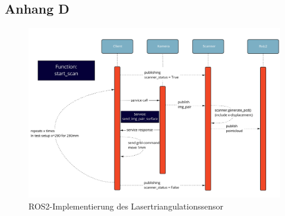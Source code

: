 \documentclass[	12pt,
				a4paper,
				bibliography=totoc,
				listof=totoc,
				index=totoc,
				twoside,
				headsepline,
				footsepline,
				ngerman]{scrartcl}
\begin{document}
\begin{appendix}
		\subsection{Anhang D}\label{anhang-d}
			\begin{figure}[h!]
				\centering
				\includegraphics[width=1\linewidth]{img/anhang/vorgang_scanablauf.jpg}
				\caption{ROS2-Implementierung des Lasertriangulationssensor}
				\label{fig:vorgang_scan}
			\end{figure}
\end{appendix}
\cleardoublepage



\listoffigures
\clearpage

\listoftables
\clearpage

\renewcommand{\lstlistlistingname}{Quellcodeverzeichnis}
\clearpage

\lstlistoflistings
\clearpage
\end{document}

